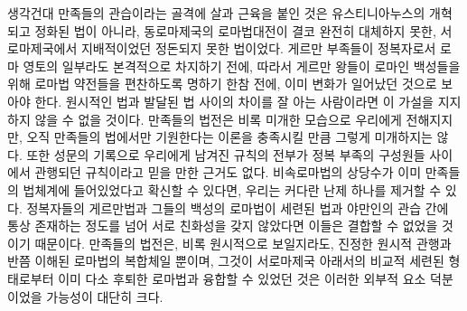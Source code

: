 생각건대
만족들의 관습이라는 골격에 살과 근육을 붙인 것은
유스티니아누스의 개혁되고 정화된 법이 아니라,
동로마제국의 로마법대전이 결코 완전히 대체하지 못한,
서로마제국에서 지배적이었던
정돈되지 못한 법이었다.
게르만 부족들이
정복자로서
로마 영토의 일부라도 본격적으로 차지하기 전에,
따라서 게르만 왕들이 로마인 백성들을 위해
로마법 약전들을 편찬하도록 명하기 한참 전에,
이미 변화가 일어났던 것으로 보아야 한다.
원시적인 법과 발달된 법 사이의 차이를 잘 아는 사람이라면
이 가설을 지지하지 않을 수 없을 것이다.
만족들의 법전은
비록 미개한 모습으로 우리에게 전해지지만,
오직 만족들의 법에서만 기원한다는 이론을 충족시킬 만큼
그렇게 미개하지는 않다.
또한
성문의 기록으로 우리에게 남겨진 규칙의 전부가
정복 부족의 구성원들 사이에서 관행되던 규칙이라고
믿을 만한 근거도 없다.
비속로마법의 상당수가
이미 만족들의 법체계에 들어있었다고 확신할 수 있다면,
우리는 커다란 난제 하나를 제거할 수 있다.
정복자들의 게르만법과
그들의 백성의 로마법이
세련된 법과 야만인의 관습 간에 통상 존재하는 정도를 넘어
서로 친화성을 갖지 않았다면
이들은
결합할 수 없었을 것이기 때문이다.
만족들의 법전은,
비록 원시적으로 보일지라도,
진정한 원시적 관행과 반쯤 이해된 로마법의 복합체일 뿐이며,
그것이
서로마제국 아래서의 비교적 세련된 형태로부터 이미 다소 후퇴한
로마법과 융합할 수 있었던 것은
이러한 외부적 요소 덕분이었을
가능성이 대단히 크다.

